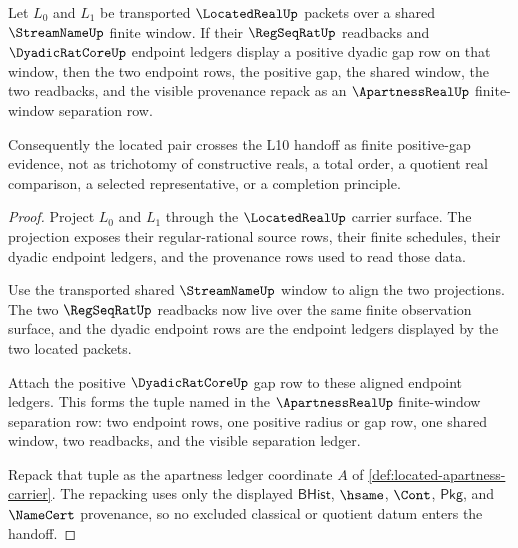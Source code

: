 \begin{theorem}
\label{thm:located-apartness-gap-handoff}
Let $L_0$ and $L_1$ be transported $\LocatedRealUp$ packets over a shared
$\StreamNameUp$ finite window. If their $\RegSeqRatUp$ readbacks and
$\DyadicRatCoreUp$ endpoint ledgers display a positive dyadic gap row on that
window, then the two endpoint rows, the positive gap, the shared window, the
two readbacks, and the visible provenance repack as an $\ApartnessRealUp$
finite-window separation row.

Consequently the located pair crosses the L10 handoff as finite positive-gap
evidence, not as trichotomy of constructive reals, a total order, a quotient
real comparison, a selected representative, or a completion principle.
\end{theorem}
\begin{proof}
Project $L_0$ and $L_1$ through the $\LocatedRealUp$ carrier surface. The
projection exposes their regular-rational source rows, their finite schedules,
their dyadic endpoint ledgers, and the provenance rows used to read those data.

Use the transported shared $\StreamNameUp$ window to align the two projections.
The two $\RegSeqRatUp$ readbacks now live over the same finite observation
surface, and the dyadic endpoint rows are the endpoint ledgers displayed by the
two located packets.

Attach the positive $\DyadicRatCoreUp$ gap row to these aligned endpoint
ledgers. This forms the tuple named in the $\ApartnessRealUp$ finite-window
separation row: two endpoint rows, one positive radius or gap row, one shared
window, two readbacks, and the visible separation ledger.

Repack that tuple as the apartness ledger coordinate $A$ of
\autoref{def:located-apartness-carrier}. The repacking uses only the displayed
$\mathsf{BHist}$, $\hsame$, $\Cont$, $\mathsf{Pkg}$, and $\NameCert$
provenance, so no excluded classical or quotient datum enters the handoff.
\end{proof}

\begin{closurestatus}{\LocatedApartnessUp}
  \theoryclosure{\seedClosure}
  \formalstatus{\unformalizedV}
\end{closurestatus}
